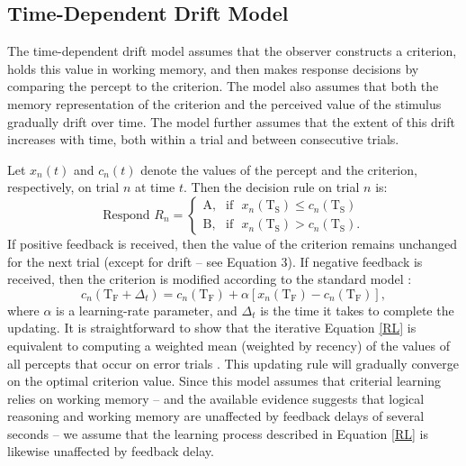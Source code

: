 \documentclass[doc, floatsintext]{apa7}
\begin{document}
\subsection{Time-Dependent Drift Model}
The time-dependent drift model assumes that the observer
constructs a criterion, holds this value in working memory,
and then makes response decisions by comparing the percept
to the criterion. The model also assumes that both the
memory representation of the criterion and the perceived
value of the stimulus gradually drift over time. The model
further assumes that the extent of this drift increases with
time, both within a trial and between consecutive trials.

Let $x_n(t)$ and $c_n(t)$ denote the values of the percept
and the criterion, respectively, on trial $n$ at time $t$.
Then the decision rule on trial $n$ is:
\begin{equation}
  \text{Respond } R_n =
  \begin{cases}
    \text{A}, & \text{if ~} x_n(\text{T}_\text{S}) \leq c_n(\text{T}_\text{S})  \\
    \text{B}, & \text{if ~} x_n(\text{T}_\text{S}) > c_n(\text{T}_\text{S}).
  \end{cases}
  \label{eq:DR}
\end{equation}
If positive feedback is received, then the value of the
criterion remains unchanged for the next trial (except for
drift -- see Equation 3). If negative feedback is received,
then the criterion is modified according to the standard
model \parencite{SuttonBarto1998}:
\begin{equation}
c_n(\text{T}_\text{F}+ \Delta_t) = c_n(\text{T}_\text{F}) + \alpha [x_n(\text{T}_\text{F}) - c_n(\text{T}_\text{F})],
\label{RL}
\end{equation}
where $\alpha$ is a learning-rate parameter, and $\Delta_t$
is the time it takes to complete the updating. It is
straightforward to show that the iterative Equation \ref{RL}
is equivalent to computing a weighted mean (weighted by
recency) of the values of all percepts that occur on error
trials \parencite[e.g.,][]{Ashby2017}. This updating rule
will gradually converge on the optimal criterion value.
Since this model assumes that criterial learning relies on
working memory -- and the available evidence suggests that
logical reasoning and working memory are unaffected by
feedback delays of several seconds \parencite[e.g., in
one-dimensional rule-based category learning
tasks;][]{ell2009critrial, MaddoxAshbyBohil2003,
MaddoxIng2005} -- we assume that the learning process
described in Equation \ref{RL} is likewise unaffected by
feedback delay.
\end{document}
